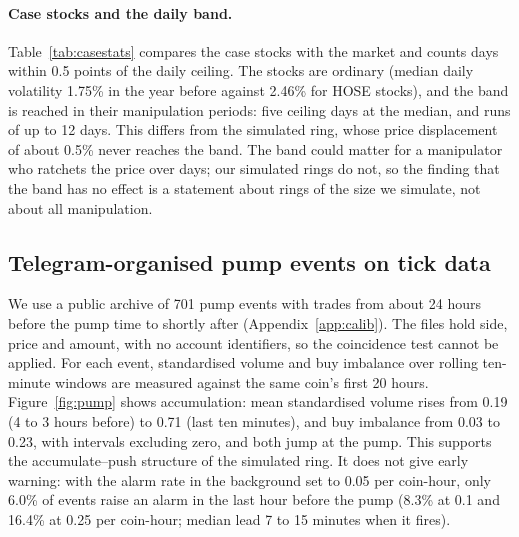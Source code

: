 \documentclass[11pt,a4paper]{article}
\begin{document}
\begin{table}[t]
\centering\small
{}
\caption{Sensitivity to the window length. Superiority against random stocks and against the same stock at other times; number of cases in the daily top ten.}\label{tab:window}
\end{table}

\paragraph{Case stocks and the daily band.} Table~\ref{tab:casestats} compares the case stocks with the market and counts days within 0.5 points of the daily ceiling. The stocks are ordinary (median daily volatility 1.75\% in the year before against 2.46\% for HOSE stocks), and the band is reached in their manipulation periods: five ceiling days at the median, and runs of up to 12 days. This differs from the simulated ring, whose price displacement of about 0.5\% never reaches the band. The band could matter for a manipulator who ratchets the price over days; our simulated rings do not, so the finding that the band has no effect is a statement about rings of the size we simulate, not about all manipulation.

\begin{table}[t]
\centering\footnotesize
{}
\caption{Case stocks: daily volatility and zero-return share in the year before the period, volatility during it, price change over the period, days within 0.5 points of the daily ceiling and the longest run of such days.}\label{tab:casestats}
\end{table}

\subsection{Telegram-organised pump events on tick data}

We use a public archive of 701 pump events with trades from about 24 hours before the pump time to shortly after (Appendix~\ref{app:calib}). The files hold side, price and amount, with no account identifiers, so the coincidence test cannot be applied. For each event, standardised volume and buy imbalance over rolling ten-minute windows are measured against the same coin's first 20 hours. Figure~\ref{fig:pump} shows accumulation: mean standardised volume rises from 0.19 (4 to 3 hours before) to 0.71 (last ten minutes), and buy imbalance from 0.03 to 0.23, with intervals excluding zero, and both jump at the pump. This supports the accumulate--push structure of the simulated ring. It does not give early warning: with the alarm rate in the background set to 0.05 per coin-hour, only 6.0\% of events raise an alarm in the last hour before the pump (8.3\% at 0.1 and 16.4\% at 0.25 per coin-hour; median lead 7 to 15 minutes when it fires).
\end{document}
